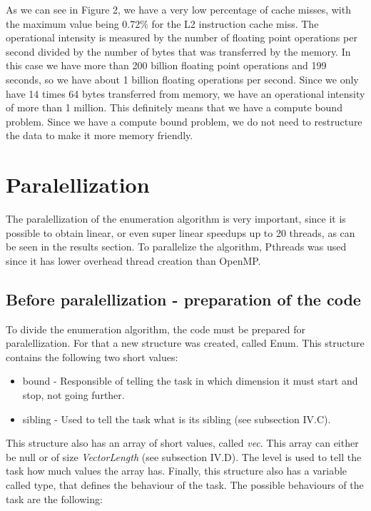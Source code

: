 \documentclass[conference]{IEEEtran}
\begin{document}
As we can see in Figure 2, we have a very low percentage of cache misses, with the maximum value being 0.72\% for the L2 instruction cache miss. The operational intensity is measured by the number of floating point operations per second divided by the number of bytes that was transferred by the memory. In this case we have more than 200 billion floating point operations and 199 seconds, so we have about 1 billion floating operations per second. Since we only have 14 times 64 bytes transferred from memory, we have an operational intensity of more than 1 million. This definitely means that we have a compute bound problem. 
Since we have a compute bound problem, we do not need to restructure the data to make it more memory friendly.

\section{Paralellization}
The paralellization of the enumeration algorithm is very important, since it is possible to obtain linear, or even super linear speedups up to 20 threads, as can be seen in the results section. 
To parallelize the algorithm, Pthreads was used since it has lower overhead thread creation than OpenMP.

\subsection{Before paralellization - preparation of the code}
To divide the enumeration algorithm, the code must be prepared for paralellization. For that a new structure was created, called Enum. This structure contains the following two short values:

\begin{itemize}
\item bound - Responsible of telling the task in which dimension it must start and stop, not going further.
\item sibling - Used to tell the task what is its sibling (see subsection IV.C).
\end{itemize}

This structure also has an array of short values, called \emph{vec}. This array can either be null or of size \emph{VectorLength} (see subsection IV.D). The level is used to tell the task how much values the array has.
Finally, this structure also has a variable called type, that defines the behaviour of the task. The possible behaviours of the task are the following:
\end{document}

